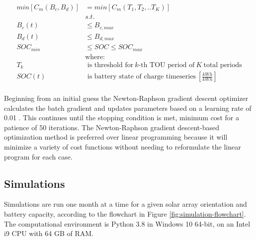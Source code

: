 \documentclass[journal,article,submit,pdftex,moreauthors]{Definitions/mdpi}
\begin{document}
\begin{equation}
  \label{eq:optimization}
  \begin{split}
    min[C_m(B_c,B_d)] & = min[C_m(T_1,T_2,..T_K)]                                                    \\
                      & s.t.                                                                         \\
    B_c(t)            & \le B_{c,max}                                                                \\
    B_d(t)            & \le B_{d,max}                                                                \\
    SOC_{min}         & \le SOC \le SOC_{max}                                                        \\
                      & \text{where:}                                                                \\
    T_k               & \text{ is threshold for}\ k\text{-th TOU period of}\ K\ \text{total periods} \\
    SOC(t)            & \text{ is battery state of charge timeseries}\ [\frac{kWh}{kWh}]             \\
  \end{split}
\end{equation}

Beginning from an initial guess the Newton-Raphson gradient descent optimizer calculates the batch gradient and updates parameters based on a learning rate of 0.01 \cite{Truong2019}. This continues until the stopping condition is met, minimum cost for a patience of 50 iterations. The Newton-Raphson gradient descent-based optimization method is preferred over linear programming because it will minimize a variety of cost functions without needing to reformulate the linear program for each case.

\subsection{Simulations}\label{simulations}%

Simulations are run one month at a time for a given solar array orientation and battery capacity, according to the flowchart in Figure \ref{fig:simulation-flowchart}. The computational environment is Python 3.8 in Windows 10 64-bit, on an Intel i9 CPU with 64 GB of RAM.
\end{document}
